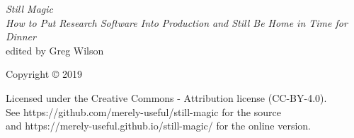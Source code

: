 {\Huge\itshape Still Magic}\\[\baselineskip]

{\large\itshape
  How to Put Research Software Into Production and Still Be Home in Time for Dinner
}\\[0.2\textheight]

{\large edited by Greg Wilson}\par

\vfill

{\large Copyright {\copyright} 2019}

\vspace*{\baselineskip}


\vspace*{\baselineskip}

{\small
  Licensed under the Creative Commons - Attribution license (CC-BY-4.0).
  \\
  See https://github.com/merely-useful/still-magic for the source\\
  and https://merely-useful.github.io/still-magic/ for the online version.
}
